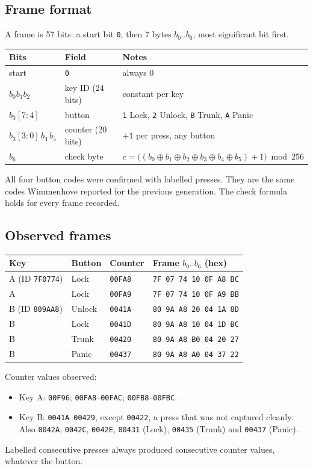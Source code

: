 \documentclass[11pt,a4paper]{article}
\newcommand{\hex}[1]{\texttt{#1}}
\begin{document}
\subsection{Frame format}
A frame is 57 bits: a start bit \texttt{0}, then 7 bytes $b_0..b_6$, most significant bit first.
\begin{table}[h]
\centering\small
\begin{tabular}{lll}
\toprule
Bits & Field & Notes \\
\midrule
start & \texttt{0} & always 0 \\
$b_0 b_1 b_2$ & key ID (24 bits) & constant per key \\
$b_3[7{:}4]$ & button & \hex{1} Lock, \hex{2} Unlock, \hex{B} Trunk, \hex{A} Panic \\
$b_3[3{:}0]\,b_4\,b_5$ & counter (20 bits) & $+1$ per press, any button \\
$b_6$ & check byte & $c = \big((b_0 \oplus b_1 \oplus b_2 \oplus b_3 \oplus b_4 \oplus b_5) + 1\big) \bmod 256$ \\
\bottomrule
\end{tabular}
\end{table}

All four button codes were confirmed with labelled presses. They are the same codes Wimmenhove reported for the previous generation. The check formula holds for every frame recorded.

\subsection{Observed frames}
\begin{table}[h]
\centering\small
\begin{tabular}{llll}
\toprule
Key & Button & Counter & Frame $b_0..b_6$ (hex) \\
\midrule
A (ID \hex{7F0774}) & Lock   & \hex{00FA8} & \hex{7F 07 74 10 0F A8 BC} \\
A                   & Lock   & \hex{00FA9} & \hex{7F 07 74 10 0F A9 BB} \\
B (ID \hex{809AA8}) & Unlock & \hex{0041A} & \hex{80 9A A8 20 04 1A 8D} \\
B                   & Lock   & \hex{0041D} & \hex{80 9A A8 10 04 1D BC} \\
B                   & Trunk  & \hex{00420} & \hex{80 9A A8 B0 04 20 27} \\
B                   & Panic  & \hex{00437} & \hex{80 9A A8 A0 04 37 22} \\
\bottomrule
\end{tabular}
\end{table}
Counter values observed:
\begin{itemize}
\item Key A: \hex{00F96}; \hex{00FA8}--\hex{00FAC}; \hex{00FB8}--\hex{00FBC}.
\item Key B: \hex{0041A}--\hex{00429}, except \hex{00422}, a press that was not captured cleanly. Also \hex{0042A}, \hex{0042C}, \hex{0042E}, \hex{00431} (Lock), \hex{00435} (Trunk) and \hex{00437} (Panic).
\end{itemize}
Labelled consecutive presses always produced consecutive counter values, whatever the button.
\end{document}
